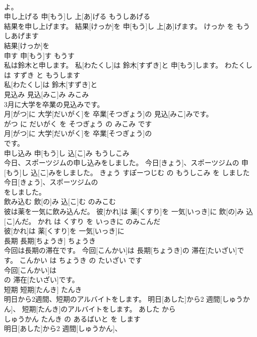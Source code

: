 \documentclass[8pt]{extreport}
\begin{document}
\begin{CJK}{UTF8}{min}
\\	よ。			
\\	申し上げる	申[もう]し 上[あ]げる	もうしあげる	
\\	結果を申し上げます。	結果[けっか]を 申[もう]し 上[あ]げます。	けっか を もうしあげます	
\\	結果[けっか]を
\\	申す	申[もう]す	もうす	
\\	私は鈴木と申します。	私[わたくし]は 鈴木[すずき]と 申[もう]します。	わたくし は すずき と もうします	
\\	私[わたくし]は 鈴木[すずき]と
\\	見込み	見込[みこ]み	みこみ	
\\	3月に大学を卒業の見込みです。	
\\	月[がつ]に 大学[だいがく]を 卒業[そつぎょう]の 見込[みこ]みです。	
\\	がつ に だいがく を そつぎょう の みこみ です	
\\	月[がつ]に 大学[だいがく]を 卒業[そつぎょう]の
\\	です。			
\\	申し込み	申[もう]し 込[こ]み	もうしこみ	
\\	今日、スポーツジムの申し込みをしました。	今日[きょう]、スポーツジムの 申[もう]し 込[こ]みをしました。	きょう すぽーつじむ の もうしこみ を しました	
\\	今日[きょう]、スポーツジムの
\\	をしました。			
\\	飲み込む	飲[の]み 込[こ]む	のみこむ	
\\	彼は薬を一気に飲み込んだ。	彼[かれ]は 薬[くすり]を 一気[いっき]に 飲[の]み 込[こ]んだ。	かれ は くすり を いっきに のみこんだ	
\\	彼[かれ]は 薬[くすり]を 一気[いっき]に
\\	長期	長期[ちょうき]	ちょうき	
\\	今回は長期の滞在です。	今回[こんかい]は 長期[ちょうき]の 滞在[たいざい]です。	こんかい は ちょうき の たいざい です	
\\	今回[こんかい]は
\\	の 滞在[たいざい]です。			
\\	短期	短期[たんき]	たんき	
\\	明日から2週間、短期のアルバイトをします。	明日[あした]から2 週間[しゅうかん]、 短期[たんき]のアルバイトをします。	あした から 
\\	しゅうかん たんき の あるばいと を します	
\\	明日[あした]から2 週間[しゅうかん]、

\end{CJK}
\end{document}
